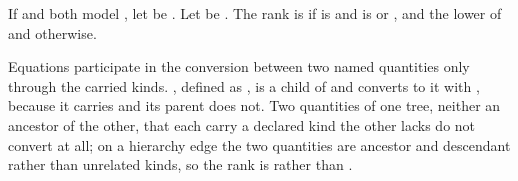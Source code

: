 \pnum
If  and  both model ,
let  be .
Let  be .
The rank is  if  is 
and  is  or ,
and the lower of  and  otherwise.
\begin{note}
Equations participate in the conversion between two named quantities
only through the carried kinds.
, defined as ,
is a child of  and converts to it with ,
because it carries  and its parent does not.
Two quantities of one tree, neither an ancestor of the other,
that each carry a declared kind the other lacks do not convert at all;
on a hierarchy edge the two quantities are ancestor and descendant rather than unrelated kinds,
so the rank is  rather than .
\end{note}

